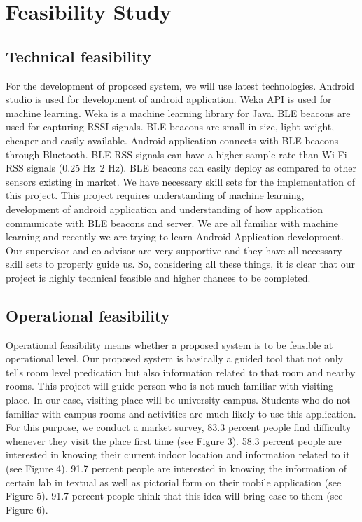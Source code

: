 \documentclass{article}
\begin{document}
\section{Feasibility Study}


\subsection{Technical feasibility}
For the development of proposed system, we will use latest technologies. Android studio is used for development of android application. Weka API is used for machine learning. Weka is a machine learning library for Java\cite{Weka}. BLE beacons are used for capturing RSSI signals. BLE beacons are small in size, light weight, cheaper and easily available. Android application connects with BLE beacons through Bluetooth. BLE RSS signals can have a higher sample rate than Wi-Fi RSS signals (0.25 Hz~2 Hz). BLE beacons can easily deploy as compared to other sensors existing in market. We have necessary skill sets for the implementation of this project. This project requires understanding of machine learning, development of android application and understanding of how application communicate with BLE beacons and server. We are all familiar with machine learning and recently we are trying to learn Android Application development. Our supervisor and co-advisor are very supportive and they have all necessary skill sets to properly guide us. So, considering all these things, it is clear that our project is highly technical feasible and higher chances to be completed.\cite{android}
\subsection{Operational feasibility}
Operational feasibility means whether a proposed system is to be feasible at operational level. Our proposed system is basically a guided tool that not only tells room level predication but also information related to that room and nearby rooms. This project will guide person who is not much familiar with visiting place. In our case, visiting place will be university campus. Students who do not familiar with campus rooms and activities are much likely to use this application. For this purpose, we conduct a market survey, 83.3 percent people find difficulty whenever they visit the place first time (see Figure 3). 58.3 percent people are interested in knowing their current indoor location and information related to it (see Figure 4). 91.7 percent people are interested in knowing the information of certain lab in textual as well as pictorial form on their mobile application (see Figure 5). 91.7 percent people think that this idea will bring ease to them (see Figure 6).
\\
\\
\end{document}
